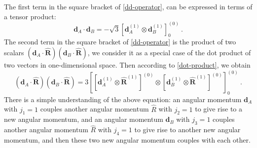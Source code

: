 The first term in the square bracket of \autoref{dd-operator}, can be expressed in terms of a tensor product:
\begin{equation}
\mathbf{d}_{A}\cdot\mathbf{d}_{B} = - \sqrt{3} \left[ \mathbf{d}_{A}^{(1)} \otimes \mathbf{d}_{B}^{(1)} \right]_{0}^{(0)} \ . \label{dot-product}
\end{equation}
The second term in the square bracket of \autoref{dd-operator} is the product of two scalars $(\mathbf{d}_{A}\cdot\mathbf{\hat{R} })(\mathbf{d}_{B}\cdot\mathbf{\hat{R}})$, we consider it as a special case of the dot product of two vectors in one-dimensional space. Then according to \autoref{dot-product}, we obtain
\begin{equation}
(\mathbf{d}_{A}\cdot\mathbf{\hat{R}})(\mathbf{d}_{B}\cdot \mathbf{\hat{R} })= 3\left[ \left[ \mathbf{d}_{A}^{(1)} \otimes \mathbf{\hat{R}}^{(1)} \right]^{(0)}\otimes \left[ \mathbf{d}_{B}^{(1)} \otimes \mathbf{\hat{R}}^{(1)} \right]^{(0)}  \right]_{0}^{(0)}  \ . \label{eqn:dRdR}
\end{equation}
There is a simple understanding of the above equation: an angular momentum $\mathbf{d}_{A}$ with $j_{1}=1$ 
couples  another angular momentum $\hat{R}$ with $j_{2}=1$ to give rise to a new angular momentum, and an 
angular momentum $\mathbf{d}_{B}$ with $j_{3}=1$ couples  another angular momentum $\hat{R}$ with $j_{4}=1$ 
to give rise to another new angular momentum, and then these two new angular momentum couples with each other. 

